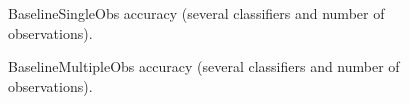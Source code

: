  \begin{figure}[h]
  \begin{subfigmatrix}{2}
  \end{subfigmatrix}
  \caption{BaselineSingleObs accuracy (several classifiers and number of observations).}
  \label{fig:baselinesingle}
\end{figure}

 \begin{figure}[h]
  \begin{subfigmatrix}{2}
  \end{subfigmatrix}
  \caption{BaselineMultipleObs accuracy (several classifiers and number of observations).}
  \label{fig:baselinemulti}
\end{figure}

